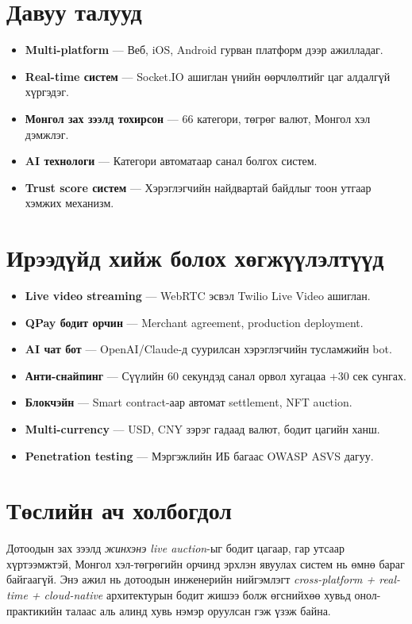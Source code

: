 \documentclass[12pt, a4paper]{report}
\begin{document}
\section*{Давуу талууд}

\begin{itemize}
  \item \textbf{Multi-platform} — Веб, iOS, Android гурван платформ дээр ажилладаг.
  \item \textbf{Real-time систем} — Socket.IO ашиглан үнийн өөрчлөлтийг цаг алдалгүй хүргэдэг.
  \item \textbf{Монгол зах зээлд тохирсон} — 66 категори, төгрөг валют, Монгол хэл дэмжлэг.
  \item \textbf{AI технологи} — Категори автоматаар санал болгох систем.
  \item \textbf{Trust score систем} — Хэрэглэгчийн найдвартай байдлыг тоон утгаар хэмжих механизм.
\end{itemize}

\section*{Ирээдүйд хийж болох хөгжүүлэлтүүд}

\begin{itemize}
  \item \textbf{Live video streaming} — WebRTC эсвэл Twilio Live Video ашиглан.
  \item \textbf{QPay бодит орчин} — Merchant agreement, production deployment.
  \item \textbf{AI чат бот} — OpenAI/Claude-д суурилсан хэрэглэгчийн тусламжийн bot.
  \item \textbf{Анти-снайпинг} — Сүүлийн 60 секундэд санал орвол хугацаа +30 сек сунгах.
  \item \textbf{Блокчэйн} — Smart contract-аар автомат settlement, NFT auction.
  \item \textbf{Multi-currency} — USD, CNY зэрэг гадаад валют, бодит цагийн ханш.
  \item \textbf{Penetration testing} — Мэргэжлийн ИБ багаас OWASP ASVS дагуу.
\end{itemize}

\section*{Төслийн ач холбогдол}

Дотоодын зах зээлд \textit{жинхэнэ live auction}-ыг бодит цагаар, гар утсаар хүртээмжтэй, Монгол хэл-төгрөгийн орчинд эрхлэн явуулах систем нь өмнө бараг байгаагүй. Энэ ажил нь дотоодын инженерийн нийгэмлэгт \textit{cross-platform + real-time + cloud-native} архитектурын бодит жишээ болж өгснийхөө хувьд онол-практикийн талаас аль алинд хувь нэмэр оруулсан гэж үзэж байна.
\end{document}
